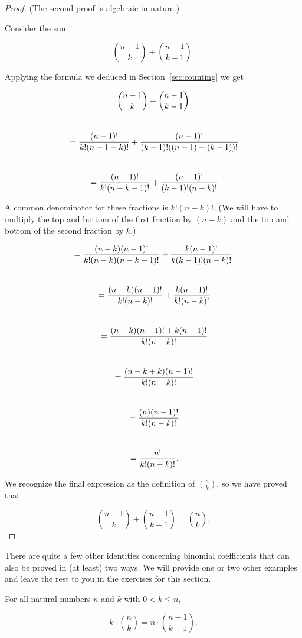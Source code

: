\begin{proof}
(The second proof is algebraic in nature.)

Consider the sum 

\[ \binom{n-1}{k} + \binom{n-1}{k-1}.\]

Applying the formula we deduced in Section~\ref{sec:counting}
we get 

\begin{gather*} 
\binom{n-1}{k} + \binom{n-1}{k-1} \\
\rule{0pt}{36pt} = \frac{(n-1)!}{k! (n-1-k)!}  + \frac{(n-1)!}{(k-1)! ((n-1)-(k-1))!} \\
\rule{0pt}{36pt} = \frac{(n-1)!}{k! (n-k-1)!}  + \frac{(n-1)!}{(k-1)! (n-k)!} \\
\end{gather*}

A common denominator for these fractions is $k!(n-k)!$.  (We will have
to multiply the top and bottom of the first fraction by $(n-k)$ and the
top and bottom of the second fraction by $k$.)

\begin{gather*} 
= \frac{(n-k)(n-1)!}{k! (n-k) (n-k-1)!}  + \frac{k (n-1)!}{k (k-1)! (n-k)!} \\
\rule{0pt}{36pt} = \frac{(n-k)(n-1)!}{k! (n-k)!}  + \frac{k (n-1)!}{k! (n-k)!} \\
\rule{0pt}{36pt} = \frac{(n-k)(n-1)! + k (n-1)!}{k! (n-k)!} \\
\rule{0pt}{36pt} = \frac{(n-k+k)(n-1)!}{k! (n-k)!} \\
\rule{0pt}{36pt} = \frac{(n)(n-1)!}{k! (n-k)!} \\
\rule{0pt}{36pt} = \frac{n!}{k! (n-k)!}. \\
\end{gather*}


We recognize the final expression as the definition of $\binom{n}{k}$,
so we have proved that

\[ \binom{n-1}{k} + \binom{n-1}{k-1} = \binom{n}{k}. \]
\end{proof}

There are quite a few other identities concerning binomial coefficients
that can also be proved in (at least) two ways.  We will provide one
or two 
other examples and leave the rest to you in the exercises for this section.

\begin{thm}
For all natural numbers $n$ and $k$ with $0 < k \leq n$,

\[ k \cdot \binom{n}{k} = n \cdot \binom{n-1}{k-1}. \]
\end{thm}

